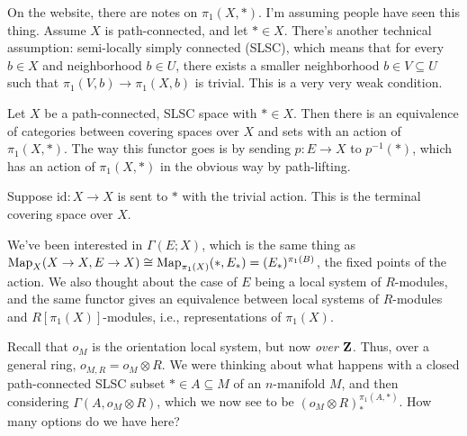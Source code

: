 On the website, there are notes on $\pi_1(X,\ast)$. I'm assuming people have seen this thing. Assume $X$ is path-connected, and let $\ast\in X$. There's another technical assumption: semi-locally simply connected (SLSC), which means that for every $b\in X$ and neighborhood $b\in U$, there exists a smaller neighborhood $b\in V\subseteq U$ such that $\pi_1(V,b)\to\pi_1(X,b)$ is trivial. This is a very very weak condition.
\begin{theorem}
Let $X$ be a path-connected, SLSC space with $\ast\in X$. Then there is an equivalence of categories between covering spaces over $X$ and sets with an action of $\pi_1(X,\ast)$. The way this functor goes is by sending $p:E\to X$ to $p^{-1}(\ast)$, which has an action of $\pi_1(X,\ast)$ in the obvious way by path-lifting.
\end{theorem}
\begin{example}
Suppose $\mathrm{id}:X\to X$ is sent to $\ast$ with the trivial action. This is the terminal covering space over $X$.
\end{example}
We've been interested in $\Gamma(E;X)$, which is the same thing as $\operatorname{Map}_X(X\to X,E\to X)\cong\operatorname{Map}_{\pi_1(X)}(\ast,E_\ast)=(E_\ast)^{\pi_1(B)}$, the fixed points of the action. We also thought about the case of $E$ being a local system of $R$-modules, and the same functor gives an equivalence between local systems of $R$-modules and $R[\pi_1(X)]$-modules, i.e., representations of $\pi_1(X)$.

Recall that $o_M$ is the orientation local system, but now \emph{over $\mathbf Z$}. Thus, over a general ring, $o_{M,R}=o_M\otimes R$. We were thinking about what happens with a closed path-connected SLSC subset $\ast\in A\subseteq M$ of an $n$-manifold $M$, and then considering $\Gamma(A,o_M\otimes R)$, which we now see to be $(o_M\otimes R)_{\ast}^{\pi_1(A,\ast)}$. How many options do we have here?

